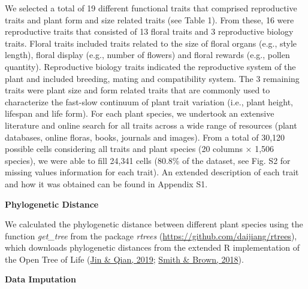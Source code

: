 \documentclass[
  12pt,
  a4paper,
]{article}
\begin{document}
We selected a total of 19 different functional traits that comprised reproductive traits and plant form and size related traits (see Table 1). From these, 16 were reproductive traits that consisted of 13 floral traits and 3 reproductive biology traits. Floral traits included traits related to the size of floral organs (e.g., style length), floral display (e.g., number of flowers) and floral rewards (e.g., pollen quantity). Reproductive biology traits indicated the reproductive system of the plant and included breeding, mating and compatibility system. The 3 remaining traits were plant size and form related traits that are commonly used to characterize the fast-slow continuum of plant trait variation (i.e., plant height, lifespan and life form). For each plant species, we undertook an extensive literature and online search for all traits across a wide range of resources (plant databases, online floras, books, journals and images). From a total of 30,120 possible cells considering all traits and plant species (20 columns × 1,506 species), we were able to fill 24,341 cells (80.8\% of the dataset, see Fig. S2 for missing values information for each trait). An extended description of each trait and how it was obtained can be found in Appendix S1.

\textbf{Phylogenetic Distance}

We calculated the phylogenetic distance between different plant species using the function \emph{get\_tree} from the package \emph{rtrees} (\url{https://github.com/daijiang/rtrees}), which downloads phylogenetic distances from the extended R implementation of the Open Tree of Life (\protect\hyperlink{ref-jin2019}{Jin \& Qian, 2019}; \protect\hyperlink{ref-smith2018}{Smith \& Brown, 2018}).

\textbf{Data Imputation}
\end{document}
